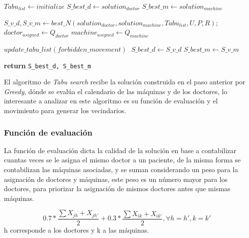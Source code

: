 \documentclass[letter, 10pt]{article}
\begin{document}
\begin{algorithm}[H]
  \caption{$ Tabu Search$}\label{TS}
  \begin{algorithmic}[1]
    \State $Tabu_{list} \gets initialize$
    \State $  S\_best\_d \gets solution_{doctor}$ 
    \State $  S\_best\_m \gets solution_{machine}$ 
    
        \State $ S\_v\_d, S\_v\_m \gets best\_N(solution_{doctor}, solution_{machine}, Tabu_{list}, U,P,R);$
        \State $ doctor_{asigned}\gets Q_{doctor}$
        \State $ machine_{asigned}\gets Q_{machine}$

        \State $ update\_tabu\_list(forbidden\_movement)\;$
            \State $ S\_best\_d \gets S\_v\_d$ 
            \State $ S\_best\_m \gets S\_v\_m$ 
        \EndIf
        
    \EndWhile
            
      \State \textbf{return} \texttt{S\_best\_d, S\_best\_m}
    \EndProcedure
  \end{algorithmic}
\end{algorithm}

El algoritmo de \textit{Tabu search} recibe la solución construida en el paso anterior por \textit{Greedy}, dónde se evalúa el calendario de las máquinas y de los doctores, lo interesante a analizar en este algoritmo es su función de evaluación y el movimiento para generar los vecindarios.
\subsubsection{Función de evaluación}
La función de evaluación dicta la calidad de la solución en base a contabilizar cuantas veces se le asigna el mismo doctor a un paciente, de la misma forma se contabilizan las máquinas asociadas, y se suman considerando un peso para la asignación de doctores y máquinas, este peso es un número mayor para los doctores, para priorizar la asignación de mismos doctores antes que mismas máquinas.

\begin{equation}\label{eq:1}
    0.7*\dfrac{\sum{X_{jh} + X_{jh'}}}{2} + 0.3*\dfrac{\sum{X_{ik} + X_{ik'}}}{2}, \forall h=h', k=k'
\end{equation}
h corresponde a los doctores y k a las máquinas.
\end{document}
